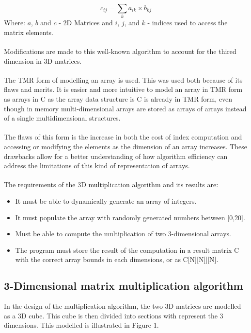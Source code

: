 \documentclass[a4paper, 11pt, onecolumn, conference]{IEEEtran}      %
\begin{document}
\begin{equation}
    c_{ij} = \sum_{k} a_{ik} \times b_{kj}  
\end{equation}
Where: $a$, $b$ and $c$ - 2D Matrices and $i$, $j$, and $k$ - indices used to access the matrix elements. 
\\\\
Modifications are made to this well-known algorithm to account for the thired dimension in 3D matrices. \\\\
The TMR form of modelling an array is used. This was used both because of its flaws and merits. It is easier and more intuitive to model an array in TMR form as arrays in C as the array data structure is C is already in TMR form, even though in memory multi-dimensional arrays are stored as arrays of arrays instead of a single multidimensional structures.\\\\
The flaws of this form is the increase in both the cost of index computation and accessing or modifying the elements as the dimension of an array increases. These drawbacks allow for a better understanding of how algorithm efficiency can address the limitations of this kind of representation of arrays. \\\\
The requirements of the 3D multiplication algorithm and its results are:

\begin{itemize}
    \item It must be able to dynamically generate an array of integers.
    \item It must populate the array with randomly generated numbers between [0,20].
    \item Must be able to compute the multiplication of two 3-dimensional arrays.
    \item The program must store the result of the computation in a result matrix C with the correct array bounds in each dimensions, or as C[N][N]][N].
\end{itemize}

\subsection{3-Dimensional matrix multiplication algorithm}
In the design of the multiplication algorithm, the two 3D matrices are modelled as a 3D cube. This cube is then divided into sections with represent the 3 dimensions. This modelled is illustrated in Figure 1.
\end{document}

